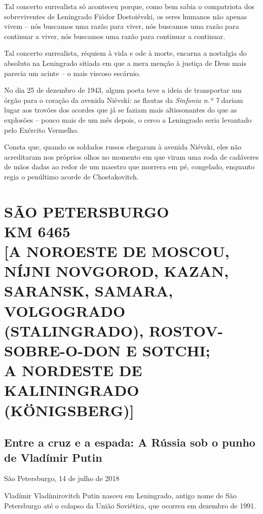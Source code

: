 Tal concerto surrealista só aconteceu porque, como bem sabia o
compatriota dos sobreviventes de Leningrado Fiódor Dostoiévski, os seres
humanos não apenas vivem -- nós buscamos uma razão para viver, nós
buscamos uma razão para continuar a viver, nós buscamos uma razão para
continuar a continuar.

Tal concerto surrealista, réquiem à vida e ode à morte, encarna a
nostalgia do absoluto na Leningrado sitiada em que a mera menção à
justiça de Deus mais parecia um acinte -- o mais viscoso escárnio.

No dia 25 de dezembro de 1943, algum poeta teve a ideia de transportar
um órgão para o coração da avenida Niévski: as flautas da \emph{Sinfonia
n.º 7} dariam lugar aos trovões dos acordes que já se faziam mais
altissonantes do que as explosões -- pouco mais de um mês depois, o
cerco a Leningrado seria levantado pelo Exército Vermelho.

Consta que, quando os soldados russos chegaram à avenida Niévski, eles
não acreditaram nos próprios olhos no momento em que viram uma roda de
cadáveres de mãos dadas ao redor de um maestro que morrera em pé,
congelado, enquanto regia o penúltimo acorde de Chostakovitch.

\movetooddpage
{}
\part*{SÃO PETERSBURGO\\KM 6465\\{[}A NOROESTE DE MOSCOU, NÍJNI NOVGOROD, KAZAN, SARANSK, SAMARA,
VOLGOGRADO (STALINGRADO), ROSTOV-SOBRE-O-DON E SOTCHI;\\A NORDESTE DE KALININGRADO (KÖNIGSBERG){]}}



\chapter*{Entre a cruz e a espada: A Rússia sob o punho de Vladímir Putin}

\begin{flushright}
São Petersburgo, 14 de julho de 2018
\end{flushright}

Vladímir Vladímirovitch Putin nasceu em Leningrado, antigo nome de São
Petersburgo até o colapso da União Soviética, que ocorreu em dezembro de
1991.

